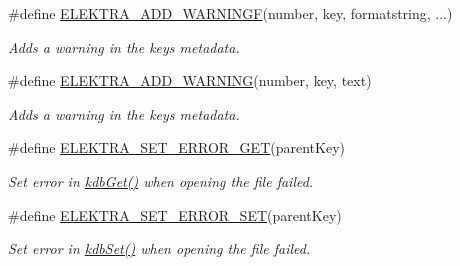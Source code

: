 \begin{DoxyCompactItemize}
\#define \hyperlink{group__plugin_ga2bbb3bc3a3bdaf5b34b52de81886a098}{E\+L\+E\+K\+T\+R\+A\+\_\+\+A\+D\+D\+\_\+\+W\+A\+R\+N\+I\+N\+GF}(number,  key,  formatstring, ...)
\begin{DoxyCompactList}\small\item\em Adds a warning in the keys metadata. \end{DoxyCompactList}\item 
\#define \hyperlink{group__plugin_ga3da3bdb0f41710adda9eee3d7adac9ff}{E\+L\+E\+K\+T\+R\+A\+\_\+\+A\+D\+D\+\_\+\+W\+A\+R\+N\+I\+NG}(number,  key,  text)
\begin{DoxyCompactList}\small\item\em Adds a warning in the keys metadata. \end{DoxyCompactList}\item 
\#define \hyperlink{group__plugin_ga2f5d331ed725c6af0c511a0aa8677daa}{E\+L\+E\+K\+T\+R\+A\+\_\+\+S\+E\+T\+\_\+\+E\+R\+R\+O\+R\+\_\+\+G\+ET}(parent\+Key)
\begin{DoxyCompactList}\small\item\em Set error in \hyperlink{group__kdb_ga28e385fd9cb7ccfe0b2f1ed2f62453a1}{kdb\+Get()} when opening the file failed. \end{DoxyCompactList}\item 
\#define \hyperlink{group__plugin_gaf526686f01dbacd68671732aad4b5d76}{E\+L\+E\+K\+T\+R\+A\+\_\+\+S\+E\+T\+\_\+\+E\+R\+R\+O\+R\+\_\+\+S\+ET}(parent\+Key)
\begin{DoxyCompactList}\small\item\em Set error in \hyperlink{group__kdb_ga11436b058408f83d303ca5e996832bcf}{kdb\+Set()} when opening the file failed. \end{DoxyCompactList}\end{DoxyCompactItemize}
